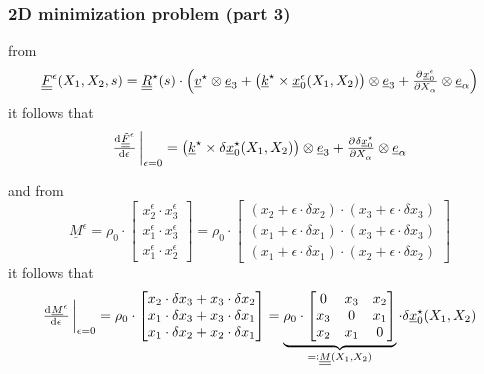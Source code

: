 \begin{frame}
  \frametitle{2D minimization problem (part 3)}

  from
  \begin{displaymath}
    \doubleunderline{F}^{\epsilon}(X_1,X_2,s) =
    \doubleunderline{R}^{\star}(s) \cdot \Bigl(
      \underline{v}^{\star} \otimes \underline{e}_3 +
      \bigl( \underline{k}^{\star} \times \underline{x}_0^{\epsilon}(X_1,X_2) \bigr) \otimes \underline{e}_3 +
      \pd{\underline{x}_0^{\epsilon}}{X_{\alpha}} \otimes \underline{e}_{\alpha}
    \Bigr)  
  \end{displaymath}
  it follows that
  \begin{displaymath}
    \od{\doubleunderline{\tilde{F}}^{\epsilon}}{\epsilon} \sVert[3]_{\epsilon=0} =
    \bigl( \underline{k}^{\star} \times \delta \underline{x}_0^{\star}(X_1,X_2) \bigr) \otimes \underline{e}_3 +
    \pd{\delta \underline{x}_0^{\star}}{X_{\alpha}} \otimes \underline{e}_{\alpha}
  \end{displaymath}
  
  \vspace{1em}
  and from
  \begin{displaymath}
    \underline{M}^{\epsilon} =
    \rho_0 \cdot 
    \begin{bmatrix}
      x_2^{\epsilon} \cdot x_3^{\epsilon} \\
      x_1^{\epsilon} \cdot x_3^{\epsilon} \\
      x_1^{\epsilon} \cdot x_2^{\epsilon} 
    \end{bmatrix} = 
    \rho_0 \cdot
    \begin{bmatrix}
      (x_2 + \epsilon \cdot \delta x_2) \cdot (x_3 + \epsilon \cdot \delta x_3) \\
      (x_1 + \epsilon \cdot \delta x_1) \cdot (x_3 + \epsilon \cdot \delta x_3) \\
      (x_1 + \epsilon \cdot \delta x_1) \cdot (x_2 + \epsilon \cdot \delta x_2) 
    \end{bmatrix}
  \end{displaymath}
  it follows that
  \begin{displaymath}
    \od{\underline{M}^{\epsilon}}{\epsilon} \sVert[3]_{\epsilon=0} =
    \rho_0 \cdot 
    \begin{bmatrix}
      x_2 \cdot \delta x_3 + x_3 \cdot \delta x_2\\
      x_1 \cdot \delta x_3 + x_3 \cdot \delta x_1\\
      x_1 \cdot \delta x_2 + x_2 \cdot \delta x_1
    \end{bmatrix} =
    \underbrace{ \rho_0 \cdot
    \begin{bmatrix}
      0 & x_3 & x_2 \\
      x_3 & 0 & x_1 \\
      x_2 & x_1 & 0
    \end{bmatrix} }_{=: \doubleunderline{M}(X_1,X_2)} \cdot \delta \underline{x}_0^{\star}(X_1,X_2)
  \end{displaymath}
  
\end{frame}


